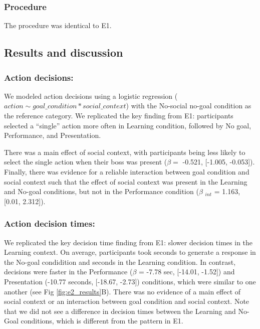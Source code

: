 \documentclass[10pt, letterpaper]{article}
\begin{document}
\subsubsection{Procedure}\label{procedure-1}

The procedure was identical to E1.

\subsection{Results and discussion}\label{results-and-discussion-1}

\subsubsection{Action decisions:}\label{action-decisions-1}

We modeled action decisions using a logistic regression
(\texttt{$action \sim goal\_condition * social\_context$}) with the
No-social no-goal condition as the reference category. We replicated the
key finding from E1: participants selected a ``single'' action more
often in Learning condition, followed by No goal, Performance, and
Presentation.

There was a main effect of social context, with participants being less
likely to select the single action when their boss was present
(\(\beta =\) -0.521, {[}-1.005, -0.053{]}). Finally, there was evidence
for a reliable interaction between goal condition and social context
such that the effect of social context was present in the Learning and
No-goal conditions, but not in the Performance condition (\(\beta\)
\(_{int}\) = 1.163, {[}0.01, 2.312{]}).

\subsubsection{Action decision times:}\label{action-decision-times-1}

We replicated the key decision time finding from E1: slower decision
times in the Learning context. On average, participants took seconds to
generate a response in the No-goal condidition and seconds in the
Learning condition. In contrast, decisions were faster in the
Performance (\(\beta\) = -7.78 sec, {[}-14.01, -1.52{]}) and
Presentation (-10.77 seconds, {[}-18.67, -2.73{]}) conditions, which
were similar to one another (see Fig \ref{fig:e2_results}B). There was
no evidence of a main effect of social context or an interaction between
goal condition and social context. Note that we did not see a difference
in decision times between the Learning and No-Goal conditions, which is
different from the pattern in E1.
\end{document}
